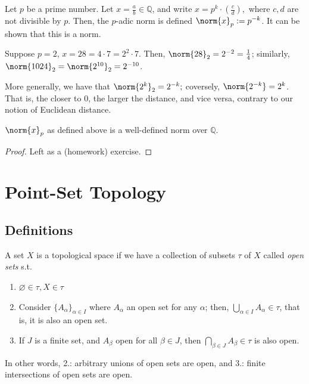 \begin{example}
    Let $p$ be a prime number. Let $x = \frac{a}{b} \in \mathbb{Q}$, and write $x = p^k\cdot \left(\frac{c}{d}\right),$ where $c, d$ are not divisible by $p$. Then, the $p$-adic norm is defined $\norm{x}_p := p^{-k}$. It can be shown that this is a norm. 

    Suppose $p = 2$, $x = 28 = 4 \cdot 7 = 2^2 \cdot 7$. Then, $\norm{28}_2 = 2^{-2} = \frac{1}{4}$; similarly, $\norm{1024}_2 = \norm{2^{10}}_2 = 2^{-10}$.

    More generally, we have that $\norm{2^k}_2 = 2^{-k};$ coversely, $\norm{2^{-k}} = 2^k$. That is, the closer to $0$, the larger the distance, and vice versa, contrary to our notion of Euclidean distance.
\end{example}

\begin{proposition}
    $\norm{x}_p$ as defined above is a well-defined norm over $\mathbb{Q}$.
\end{proposition}

\begin{proof}
    Left as a (homework) exercise.
\end{proof}

\section{Point-Set Topology}
\subsection{Definitions}
\begin{definition}
    A set $X$ is a topological space if we have a collection of subsets $\tau$ of $X$ called \emph{open sets} s.t. 
    \begin{enumerate}
        \item $\varnothing \in \tau, X \in \tau$
        \item Consider $\{A_\alpha\}_{\alpha \in I}$ where $A_\alpha$ an open set for any $\alpha$; then, $\bigcup_{\alpha \in I} A_\alpha \in \tau$, that is, it is also an open set.
        \item If $J$ is a finite set, and $A_\beta$ open for all $\beta \in J$, then $\bigcap_{\beta \in J} A_\beta \in \tau$ is also open.
    \end{enumerate}
    In other words, 2.: arbitrary unions of open sets are open, and 3.: finite intersections of open sets are open.
\end{definition}

